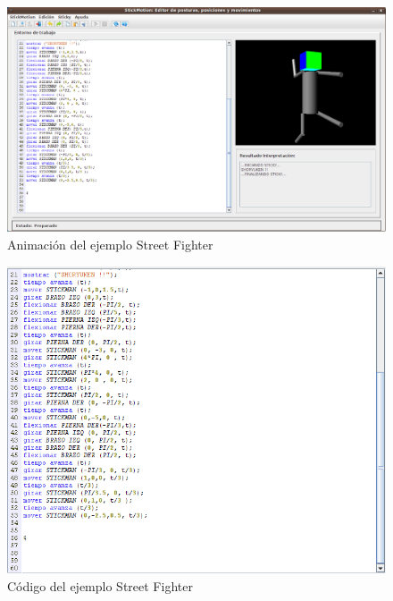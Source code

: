 \documentclass[a4paper, 12pt]{book}
\begin{document}
\begin{itemize}
\begin{figure}[htb]
  \centerline{\includegraphics[width=\textwidth]{./imagenes/streetfighter2.png}}
  \caption{Animación del ejemplo Street Fighter}
\end{figure}


\begin{figure}[htb]
\centerline{\includegraphics[width=\textwidth]{./imagenes/streetfighter-codigo.png}}
\caption{Código  del ejemplo Street Fighter}
\end{figure}



\end{itemize}
\end{document}
